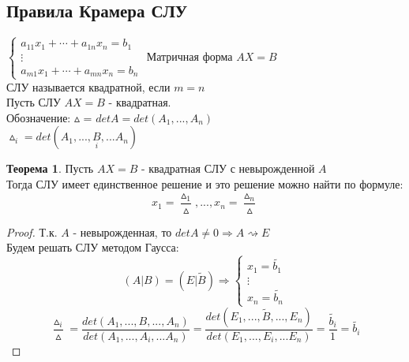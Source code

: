 \documentclass[a4paper, 12pt]{article}
\theoremstyle{definition}
\newtheorem*{theorem}{Теорема}
\begin{document}
  \subsection{Правила Крамера СЛУ}
  $\begin{cases}
    a_{11}x_1 + \cdots + a_{1n}x_n = b_1 \\
    \vdots \\ 
    a_{m1}x_1 + \cdots + a_{mn}x_n = b_n 
  \end{cases}$
  Матричная форма $AX=B$ \vspace{0.5cm}\\ 
  СЛУ называется квадратной, если $m=n$ \\
  Пусть СЛУ $AX=B$  - квадратная. \\
  Обозначение: $\vartriangle$ = $detA = det(A_1,...,A_n)$\\
  $\vartriangle_i = det(A_1,...,\underset{i}{B} ,...A_n)$
  \begin{theorem}
    Пусть $AX = B$ - квадратная СЛУ с невырожденной $A$ \\
    Тогда СЛУ имеет единственное решение и это решение можно найти по формуле:
    $$x_1 = \frac{\vartriangle_1}{\vartriangle },...,x_n = \frac{\vartriangle_n}{\vartriangle }$$  
  \end{theorem} 
  \begin{proof}
    Т.к. $A$ - невырожденная, то $detA \not = 0 \Longrightarrow A\rightsquigarrow E$\\
    Будем решать СЛУ методом Гаусса:
    $$(A|B) = (E|\widetilde{B}
    ) \Longrightarrow \begin{cases}
      x_1 = \widetilde{b_1}\\
      \vdots \\
      x_n = \widetilde{b_n}
    \end{cases}$$
    $$\frac{\vartriangle_i}{\vartriangle } = \frac{det(A_1,...,B,...,A_n)}{det(A_1,...,A_i,...A_n)} = \frac{det(E_1,...,\widetilde{B},...,E_n)}{det(E_1,...,E_i,...E_n)} = \frac{\widetilde{b_i}}{1} = \widetilde{b_i}$$  
  \end{proof} 
\end{document}
